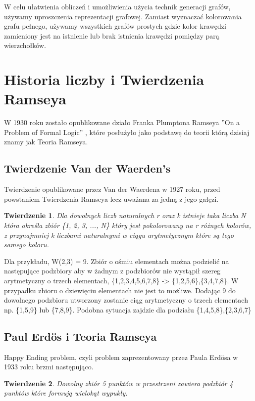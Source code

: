 \documentclass[11pt]{article}
\newtheorem{theorem}{Twierdzenie}
\begin{document}
W celu ułatwienia obliczeń i umożliwienia użycia technik generacji grafów, używamy uproszczenia reprezentacji grafowej. Zamiast wyznaczać kolorowania grafu pełnego, używamy wszystkich grafów prostych gdzie kolor krawędzi zamieniony jest na istnienie lub brak istnienia krawędzi pomiędzy parą wierzchołków.

\section{Historia liczby i Twierdzenia Ramseya}

W 1930 roku zostało opublikowane działo Franka Plumptona Ramseya ''On a Problem of Formal Logic''\cite{ramsey} , które posłużyło jako podstawę do teorii którą dzisiaj znamy jak Teoria Ramseya. 


\subsection{Twierdzenie Van der Waerden's}
Twierdzenie opublikowane przez Van der Waerdena w 1927 roku, przed powstaniem Twierdzenia Ramseya lecz uważana za jedną z jego gałęzi. 

\begin{theorem}
Dla dowolnych liczb naturalnych r oraz k istnieje taka liczba N która określa zbiór \{1, 2, 3, ..., N\} który jest pokolorowany na r różnych kolorów, z przynajmniej k liczbami naturalnymi w ciągu arytmetycznym które są tego samego koloru.\cite{theory} 
\end{theorem}

Dla przykładu, W(2,3) = 9. Zbiór o ośmiu elementach można podzielić na następujące podzbiory aby w żadnym z podzbiorów nie wystąpił szereg arytmetyczny o trzech elementach, \{1,2,3,4,5,6,7,8\} -> \{1,2,5,6\},\{3,4,7,8\}. W przypadku zbioru o dziewięciu elementach nie jest to możliwe. Dodając 9 do dowolnego podzbioru utworzony zostanie ciąg arytmetyczny o trzech elementach np. \{1,5,9\} lub \{7,8,9\}. Podobna sytuacja zajdzie dla podziału \{1,4,5,8\},\{2,3,6,7\}

\subsection{Paul Erd\"os i Teoria Ramseya}

Happy Ending problem, czyli problem zaprezentowany przez Paula Erd\"osa w 1933 roku brzmi następująco. 

\begin{theorem}
Dowolny zbiór 5 punktów w przestrzeni zawiera podzbiór 4 punktów które formują wielokąt wypukły.
\end{theorem}
\end{document}
